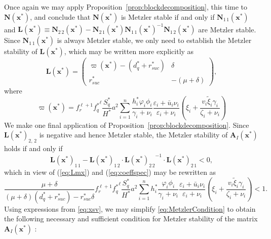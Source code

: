\documentclass[a4paper]{article}
\newcommand{\varpiVar}{r_{suc}}
\newcommand{\hatmuVar}{d_q}
\begin{document}
\noindent Once again we may apply Proposition~\ref{prop:blockdecomposition}, this time to  $\mathbf N(\mathbf x^*)$, and conclude that 
$\mathbf N(\mathbf x^*)$ is Metzler stable if and only if $\mathbf N_{1\,1}(\mathbf x^*)$ and $\mathbf L(\mathbf x^*) \equiv  \mathbf N_{2\,2}(\mathbf x^*)-\mathbf N_{2\,1}(\mathbf x^*){\mathbf N_{1\,1}(\mathbf x^*)}^{-1}\mathbf N_{1\,2}(\mathbf x^*)$ are Metzler stable. Since $\mathbf N_{1\,1}(\mathbf x^*)$ is always Metzler stable, we only need to establish the Metzler stability of $\mathbf L(\mathbf x^*)$, which may be written more explicitly as
\begin{equation}\label{eq:Lmx}  
\mathbf L(\mathbf x^*) =\left(\begin{array}{cc}\varpi(\mathbf
x^*)-(\hatmuVar ^*+\varpiVar ^*)&\delta\\\varpiVar ^*&-(\mu+\delta)\end{array}\right),
\end{equation}
where
\begin{equation}\label{eq:coeffspec}
\varpi(\mathbf x^*)=f_r^{\ell+1}{f_q^*}^\ell \dfrac{S^*_q}{H^*}a^2\sum_{i=1}^n\frac{h^*_i\varphi_i\phi_i}{\gamma_i+\nu_i}\frac{\varepsilon_i+\bar u_i \nu_i}{\varepsilon_i+\nu_i}\left(\xi_{i}+\frac{v_i\widetilde \xi_{i}\gamma_i}{\zeta_i+\nu_i}\right)
\end{equation}
\noindent 
We make one final application of Proposition~\ref{prop:blockdecomposition}. Since $\mathbf L(\mathbf
x^*)_{2,\,2}$ is negative and hence Metzler stable,  the Metzler stability of   $\mathbf
A_I(\mathbf x^*)$ holds if and only if
$$\mathbf
L(\mathbf x^*)_{1\,1}-\mathbf L(\mathbf x^*)_{1\,2}\cdot{\mathbf L(\mathbf x^*)_{2\,2}}^{-1}\cdot\mathbf L(\mathbf x^*)_{2\,1}<0,$$  
which in view of (\ref{eq:Lmx}) and (\ref{eq:coeffspec}) may be rewritten as
\begin{equation}\label{eq:MetzlerCondition}
\dfrac{\mu+\delta}{(\mu+\delta)(\hatmuVar ^*+\varpiVar ^*)
	-\varpiVar ^*\delta}f_r^{\ell+1}{f_q^*}^\ell\dfrac{S^*_q}{H^*}a^2\sum_{i=1}^nh_i^*\frac{\varphi_i\phi_i}{\gamma_i+\nu_i}\frac{\varepsilon_i+\bar u_i\nu_i }{\varepsilon_i+\nu_i}\left(\xi_{i}+\frac{v_i\widetilde \xi_{i}\gamma_i}{\zeta_i+\nu_i}\right)<1.
\end{equation}
Using expressions from \eqref{eq:xsv}, we may simplify \eqref{eq:MetzlerCondition} to obtain the following necessary and sufficient condition for Metzler stability of the matrix $\mathbf A_I(\mathbf x^*)$ :
\end{document}
